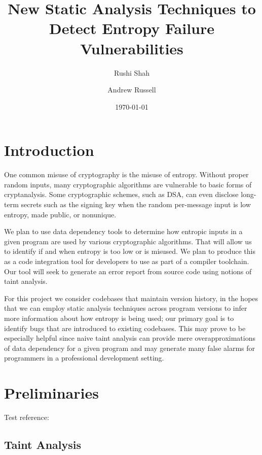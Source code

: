\documentclass[letterpaper,twocolumn,10pt]{article}
\begin{document}
\date{\today}

\title{\Large \bf New Static Analysis Techniques to Detect Entropy Failure Vulnerabilities}

\author{
{\rm Rushi Shah}
\and
{\rm Andrew Russell}
}

\maketitle

\section{Introduction}

One common misuse of cryptography is the misuse of entropy. Without proper random inputs, many cryptographic algorithms
are vulnerable to basic forms of cryptanalysis. Some cryptographic schemes, such as DSA, can even disclose long-term secrets
such as the signing key when the random per-message input is low entropy, made public, or nonunique.

We plan to use data dependency tools to determine how entropic inputs in a given program are used by various cryptographic algorithms. That will allow us to identify if and when entropy is too low or is misused. We plan to produce this as a code integration tool for developers to use as part of a compiler toolchain.
Our tool will seek to generate an error report from source code using notions of taint analysis. 

For this project we consider codebases that maintain version history, in the hopes that we can employ static analysis techniques across program versions to infer more information about how entropy is being used; 
our primary goal is to identify bugs that are introduced to existing codebases. This may prove to be especially helpful since naive taint analysis can provide mere overapproximations of data dependency for a given program and may generate many false alarms for programmers in a professional development setting.

\section{Preliminaries}

Test reference: \cite{GKW18}

\subsection{Taint Analysis}
\end{document}
